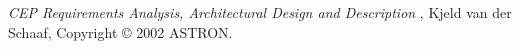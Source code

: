 \documentclass[]{lofar}
\begin{document}
%	
%	

\begin{thebibliography}{WIDELABEL}

\emph{CEP Requirements Analysis, Architectural Design and Description} , Kjeld van der Schaaf, Copyright \copyright{} 2002 ASTRON. \label{LOFAR-ASTRON-MEM-035}


\end{thebibliography}

\end{document}
